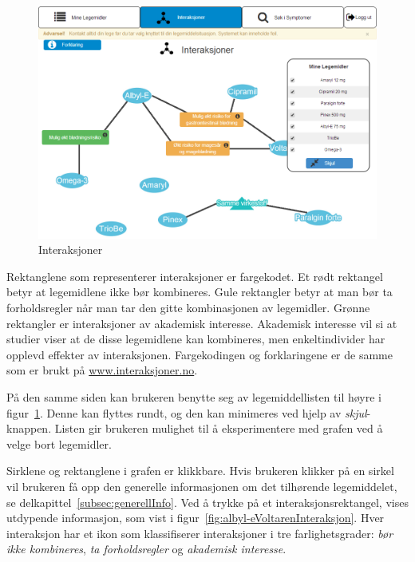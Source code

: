 \begin{figure}[H]
    \centering
    \includegraphics[width=1\textwidth]{fig/utviklingAvPrototype/interaksjonsGraf.PNG}
    \caption{Interaksjoner}
    \label{fig:interaksjonsGraf}
\end{figure} 

Rektanglene som representerer interaksjoner er fargekodet. Et rødt rektangel betyr at legemidlene ikke bør kombineres. Gule rektangler betyr at man bør ta forholdsregler når man tar den gitte kombinasjonen av legemidler. Grønne rektangler er interaksjoner av akademisk interesse. Akademisk interesse vil si at studier viser at de disse legemidlene kan kombineres, men enkeltindivider har opplevd effekter av interaksjonen. Fargekodingen og forklaringene er de samme som er brukt på \url{www.interaksjoner.no}.

På den samme siden kan brukeren benytte seg av legemiddellisten til høyre i figur~\ref{fig:interaksjonsGraf}. Denne kan flyttes rundt, og den kan minimeres ved hjelp av \textit{skjul}-knappen. Listen gir brukeren mulighet til å eksperimentere med grafen ved å velge bort legemidler. 

Sirklene og rektanglene i grafen er klikkbare. Hvis brukeren klikker på en sirkel vil brukeren få opp den generelle informasjonen om det tilhørende legemiddelet, se delkapittel~\ref{subsec:generellInfo}. Ved å trykke på et interaksjonsrektangel, vises utdypende informasjon, som vist i figur~\ref{fig:albyl-eVoltarenInteraksjon}. Hver interaksjon har et ikon som klassifiserer interaksjoner i tre farlighetsgrader: \textit{bør ikke kombineres}, \textit{ta forholdsregler} og \textit{akademisk interesse}. 


